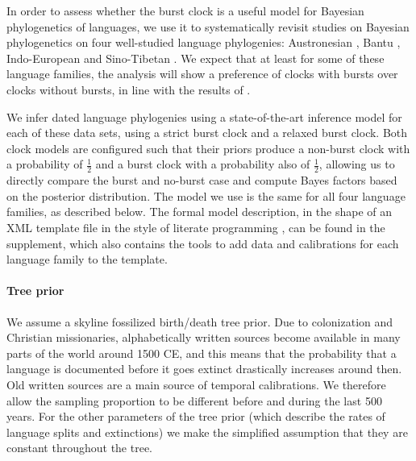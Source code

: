 \documentclass[]{rsos}%
\begin{document}
In order to assess whether the burst clock is a useful model for Bayesian
phylogenetics of languages, we use it to systematically revisit studies on Bayesian phylogenetics
on four well-studied language phylogenies:
Austronesian
\parencite{gray2009language,greenhill2017evolutionary,greenhill2018population},
Bantu
\parencite{grollemund2015bantu,greenhill2018population,currie2013cultural},
Indo-European
\parencite{bouckaert2012mapping,chang2015ancestryconstrained,gray2003language,holm2017steppe,rama2018three,willems2016using}
and
Sino-Tibetan \parencite{sagart2019dated,zhang2019phylogenetic}.
We expect that at least for some of these language families, the analysis will show
a preference of clocks with bursts over clocks without bursts,
in line with the results of \textcite{atkinson2008languages}.

We infer dated language phylogenies using a state-of-the-art inference model for each of these data sets, using a strict burst clock and a relaxed burst clock.
Both clock models are configured such that their priors produce a non-burst clock with a
probability of $\frac{1}{2}$ and a burst clock with a probability also of
$\frac{1}{2}$, allowing us to directly compare the burst and no-burst case and compute Bayes factors based on the posterior
distribution.
The model we use is the same for all four language families, as described below.
The formal model description, in the shape of an XML template file in the
style of literate programming \parencite{knuth1984literate}, can be found in the supplement,
which also contains the tools to add data and calibrations for each language
family to the template. 

\paragraph{Tree prior}
We assume a skyline fossilized birth/death tree prior.
Due to colonization and Christian missionaries,
alphabetically written sources become available in many parts of the world around
1500 CE, and this means that the probability that a language is documented before
it goes extinct drastically increases around then. Old written sources are a
main source of temporal calibrations.
We therefore allow the sampling proportion to be different before and during the last 500 years.
For the other parameters of the tree prior (which describe the rates of language splits and extinctions) we make the simplified assumption that they are constant throughout the tree.
\end{document}
